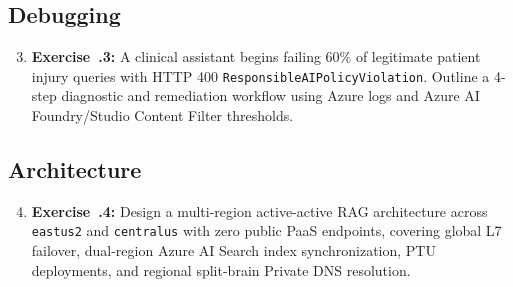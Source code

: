 \subsection{Debugging}
\begin{enumerate}[leftmargin=18pt]
  \setcounter{enumi}{2}
  \item \textbf{Exercise~\thechapter.3:} A clinical assistant begins failing 60\% of legitimate patient injury queries with HTTP 400 \texttt{ResponsibleAIPolicyViolation}. Outline a 4-step diagnostic and remediation workflow using Azure logs and Azure AI Foundry/Studio Content Filter thresholds.
\end{enumerate}

\subsection{Architecture}
\begin{enumerate}[leftmargin=18pt]
  \setcounter{enumi}{3}
  \item \textbf{Exercise~\thechapter.4:} Design a multi-region active-active RAG architecture across \texttt{eastus2} and \texttt{centralus} with zero public PaaS endpoints, covering global L7 failover, dual-region Azure AI Search index synchronization, PTU deployments, and regional split-brain Private DNS resolution.
\end{enumerate}

